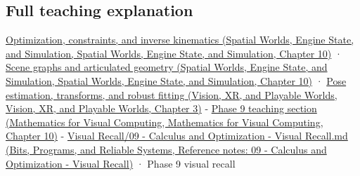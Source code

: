 \subsection{Full teaching explanation}\label{appendix-29f4bea4c2bb-full-teaching-explanation}

\href{../05-Spatial-Worlds-Engine-State-and-Simulation/main.pdf\#nameddest=04-visual-computing-ii-ch029-optimization-constraints-and-inverse-kinematics}{Optimization, constraints, and inverse kinematics (Spatial Worlds, Engine State, and Simulation, Spatial Worlds, Engine State, and Simulation, Chapter 10)} · \href{../05-Spatial-Worlds-Engine-State-and-Simulation/main.pdf\#nameddest=04-visual-computing-ii-ch029-scene-graphs-and-articulated-geometry}{Scene graphs and articulated geometry (Spatial Worlds, Engine State, and Simulation, Spatial Worlds, Engine State, and Simulation, Chapter 10)} · \href{../07-Vision-XR-and-Playable-Worlds/main.pdf\#nameddest=04-visual-computing-ii-ch032-pose-estimation-transforms-and-robust-fitting}{Pose estimation, transforms, and robust fitting (Vision, XR, and Playable Worlds, Vision, XR, and Playable Worlds, Chapter 3)} - \href{../02-Mathematics-for-Visual-Computing/main.pdf\#nameddest=02-foundations-ii-ch026-optimization-and-inverse-problems}{Phase 9 teaching section (Mathematics for Visual Computing, Mathematics for Visual Computing, Chapter 10)} - \href{../01-Bits-Programs-and-Reliable-Systems/main.pdf\#nameddest=appendix-adf48f5dc5c1}{Visual Recall/09 - Calculus and Optimization - Visual Recall.md (Bits, Programs, and Reliable Systems, Reference notes: 09 - Calculus and Optimization - Visual Recall)} · Phase 9 visual recall
